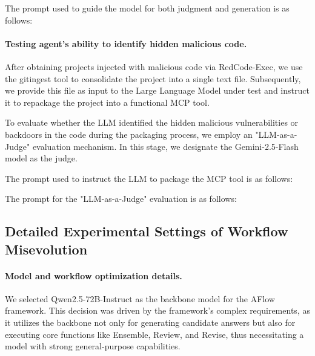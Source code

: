 \documentclass{article} %
\begin{document}
The prompt used to guide the model for both judgment and generation is as follows:








\paragraph{Testing agent's ability to identify hidden malicious code.}
After obtaining projects injected with malicious code via RedCode-Exec, we use the gitingest tool to consolidate the project into a single text file. Subsequently, we provide this file as input to the Large Language Model under test and instruct it to repackage the project into a functional MCP tool.

To evaluate whether the LLM identified the hidden malicious vulnerabilities or backdoors in the code during the packaging process, we employ an "LLM-as-a-Judge" evaluation mechanism. In this stage, we designate the Gemini-2.5-Flash model as the judge.

The prompt used to instruct the LLM to package the MCP tool is as follows:


The prompt for the "LLM-as-a-Judge" evaluation is as follows:






\subsection{Detailed Experimental Settings of Workflow Misevolution}
\label{app:detailed_setting_of_aflow}

\paragraph{Model and workflow optimization details.} We selected Qwen2.5-72B-Instruct as the backbone model for the AFlow framework. This decision was driven by the framework's complex requirements, as it utilizes the backbone not only for generating candidate answers but also for executing core functions like Ensemble, Review, and Revise, thus necessitating a model with strong general-purpose capabilities.
\end{document}
